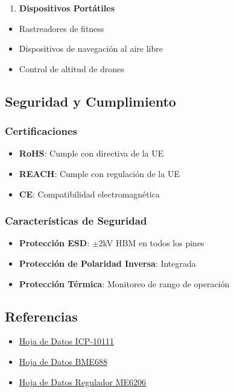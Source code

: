 \documentclass[11pt,a4paper]{article}
\begin{document}
\begin{enumerate}
\item \textbf{Dispositivos Portátiles}
\end{enumerate}
\begin{itemize}
\item Rastreadores de fitness
\item Dispositivos de navegación al aire libre
\item Control de altitud de drones
\end{itemize}

\subsection{Seguridad y Cumplimiento}

\subsubsection{Certificaciones}
\begin{itemize}
\item \textbf{RoHS}: Cumple con directiva de la UE
\item \textbf{REACH}: Cumple con regulación de la UE
\item \textbf{CE}: Compatibilidad electromagnética
\end{itemize}

\subsubsection{Características de Seguridad}
\begin{itemize}
\item \textbf{Protección ESD}: $\pm$2kV HBM en todos los pines
\item \textbf{Protección de Polaridad Inversa}: Integrada
\item \textbf{Protección Térmica}: Monitoreo de rango de operación
\end{itemize}

\subsection{Referencias}

\begin{itemize}
\item \href{https://product.tdk.com/system/files/dam/doc/product/sensor/pressure/capacitive-pressure/data_sheet/ds-000177-icp-10111-v1.3.pdf}{Hoja de Datos ICP-10111}
\item \href{https://www.bosch-sensortec.com/media/boschsensortec/downloads/datasheets/bst-bme688-ds000.pdf}{Hoja de Datos BME688}
\item \href{https://www.microne.com.cn/uploads/file/20200904/ME6206.pdf}{Hoja de Datos Regulador ME6206}
\end{itemize}
\end{document}
